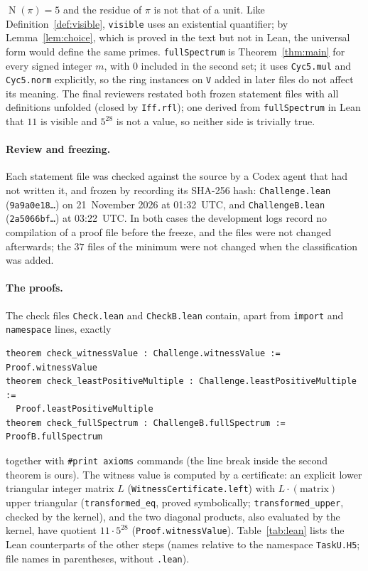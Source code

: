 \documentclass[11pt]{article}
\theoremstyle{definition}
\theoremstyle{remark}
\newcommand{\N}{\operatorname{N}}
\begin{document}
{$\N(\pi)=5$ and the residue of $\pi$ is not that of a unit. Like
Definition~\ref{def:visible}, \texttt{visible} uses an existential
quantifier; by Lemma~\ref{lem:choice}, which is proved in the text but not in
Lean, the universal form would define the same primes. \texttt{fullSpectrum} is Theorem~\ref{thm:main}
for every signed integer $m$, with $0$ included in the second set; it uses
\texttt{Cyc5.mul} and \texttt{Cyc5.norm} explicitly, so the ring instances on
\texttt{V} added in later files do not affect its meaning. The final reviewers
restated both frozen statement files with all definitions unfolded (closed by
\texttt{Iff.rfl}); one derived from \texttt{fullSpectrum} in Lean that $11$ is
visible and $5^{28}$ is not a value, so neither side is trivially true.

\paragraph{Review and freezing.} Each statement file was checked against the
source by a Codex agent that had not written it, and frozen by recording its
SHA-256 hash: \texttt{Challenge.lean} (\texttt{9a9a0e18\ldots}) on
21~November 2026 at 01:32~UTC, and \texttt{ChallengeB.lean}
(\texttt{2a5066bf\ldots}) at 03:22~UTC. In both cases the development logs
record no compilation of a proof file before the freeze, and the files were
not changed afterwards; the $37$ files of the minimum were not changed when
the classification was added.

\paragraph{The proofs.} The check files \texttt{Check.lean} and
\texttt{CheckB.lean} contain, apart from \texttt{import} and \texttt{namespace}
lines, exactly
{\footnotesize
\begin{verbatim}
theorem check_witnessValue : Challenge.witnessValue := Proof.witnessValue
theorem check_leastPositiveMultiple : Challenge.leastPositiveMultiple :=
  Proof.leastPositiveMultiple
theorem check_fullSpectrum : ChallengeB.fullSpectrum := ProofB.fullSpectrum
\end{verbatim}}
\noindent together with \texttt{\#print axioms} commands (the line break
inside the second theorem is ours).
The witness value is computed by a certificate: an explicit lower triangular
integer matrix $L$ (\texttt{WitnessCertificate.left}) with
$L\cdot(\text{matrix})$ upper triangular (\texttt{transformed\_eq}, proved
symbolically; \texttt{transformed\_upper}, checked by the kernel), and the two
diagonal products, also evaluated by the kernel, have quotient
$11\cdot5^{28}$ (\texttt{Proof.witnessValue}). Table~\ref{tab:lean} lists the
Lean counterparts of the other steps (names relative to the namespace
\texttt{TaskU.H5}; file names in parentheses, without \texttt{.lean}).

}
\end{document}
